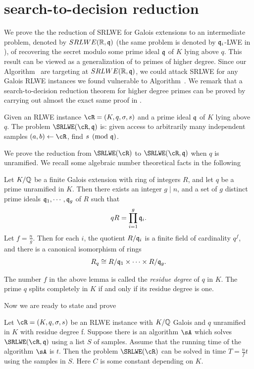 \documentclass{amsart}
\begin{document}
\section{search-to-decision reduction}
\label{sec: s-to-d}

We prove the the reduction of SRLWE for Galois extensions to an intermediate problem, denoted by $SRLWE(\mathbb{R},\mathfrak{q})$ (the same problem is denoted by $\mathfrak{q}_i$-LWE in \cite{lyubashevsky2013ideal}), of recovering the secret modulo some prime ideal $\mathfrak{q}$ of $K $ lying above $q$. This result can be viewed as a generalization of \cite[Theorem 2]{eisentrager2014weak} to primes of higher degree. Since our Algorithm~ are targeting at $SRLWE(\mathbb{R},\mathfrak{q})$, we could attack SRLWE for any Galois RLWE instances we found vulnerable to Algorithm~. We remark that a search-to-decision reduction theorem for higher degree primes can be proved by carrying out almost the exact same proof in \cite{eisentrager2014weak}.

\begin{Definition} \label{def: srlwe mod q}
Given an RLWE instance $\cR = (K,q,\sigma, s)$ and a prime ideal $\mathfrak{q}$ of $K$ lying above $q$. The problem $\SRLWE(\cR, \fq)$ is: given access to arbitrarily many independent samples $(a,b) \gets \cR$, find $s \pmod {\mathfrak{q}}$.
\end{Definition}

We prove the reduction from $\SRLWE(\cR)$ to $\SRLWE(\cR,\fq)$ when
$q$ is unramified. We recall some algebraic number theoretical facts in the following
\begin{Lemma}
\label{lem: prime factorization}
Let $K/\mathbb{Q}$ be a finite Galois extension with ring of integers $R$,  and let $q$ be a prime unramified in $K$. Then there exists an integer $g \mid n$, and a set of $g$ distinct prime ideals $\mathfrak{q}_1, \cdots ,\mathfrak{q}_g$ of
$R$ such that
\[
    qR = \prod_{i=1}^g \mathfrak{q}_i.
\]
Let $f = \frac{n}{g}$. Then for each $i$, the quotient $R/\mathfrak{q}_{i}$ is a finite field of cardinality $q^f$, and there is a canonical isomorphism of rings
\[
    R_q \cong R/\mathfrak{q}_{1} \times \cdots \times R/\mathfrak{q}_{g}.
\]
\end{Lemma}
The number $f$ in the above lemma is called the {\it residue degree} of $q$ in $K$. The prime $q$ splits completely in $K$ if and only if its residue degree is one.

Now we are ready to state and prove
\begin{theorem}
Let $\cR = (K,q,\sigma, s)$ be an RLWE instance with $K/\mathbb{Q}$ Galois and $q$ unramified in $K$ with residue degree f. Suppose there is an algorithm $\sA$ which solves $\SRLWE(\cR,\fq)$ using a list $S$ of samples. Assume that the running time of the algorithm $\sA$ is $t$. Then the problem $\SRLWE(\cR)$ can be solved in time $T = \frac{n}{f}t$ using the samples in $S$. Here $C$ is some constant depending on $K$.
\end{theorem}
\end{document}

